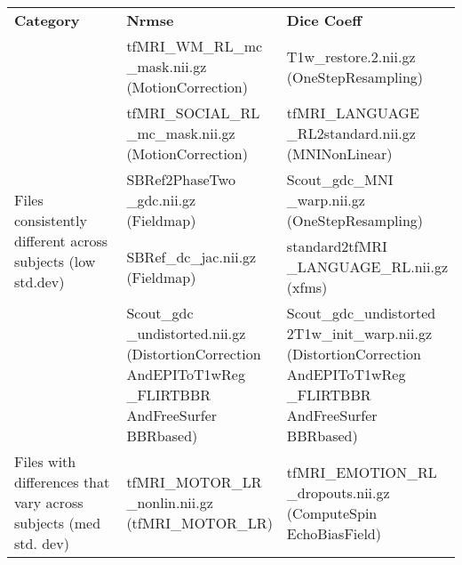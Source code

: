 \begin{center}
\begin{longtable}{|p{}|p{}|p{}|}
\cline{1-3}
\textbf{Category} & \textbf{Nrmse} & \textbf{Dice Coeff} \\\cline{1-3}
\multirow{5}{.3\textwidth}{Files consistently different across subjects (low std.dev)}     & \makecell[l]{tfMRI\_WM\_RL\_mc\\\_mask.nii.gz \\ (MotionCorrection)}  & \makecell[l]{T1w\_restore.2.nii.gz\\(OneStepResampling)} \\\cline{2-3}
& \makecell[l]{tfMRI\_SOCIAL\_RL\\\_mc\_mask.nii.gz\\(MotionCorrection)}                   & \makecell[l]{tfMRI\_LANGUAGE\\\_RL2standard.nii.gz\\(MNINonLinear)} \\\cline{2-3}
& \makecell[l]{SBRef2PhaseTwo\\\_gdc.nii.gz\\(Fieldmap)}                        & \makecell[l]{Scout\_gdc\_MNI\\\_warp.nii.gz\\(OneStepResampling)} \\\cline{2-3}
& \makecell[l]{SBRef\_dc\_jac.nii.gz\\(Fieldmap)}                        & \makecell[l]{standard2tfMRI\\\_LANGUAGE\_RL.nii.gz\\(xfms)} \\\cline{2-3}
& \makecell[l]{Scout\_gdc\\\_undistorted.nii.gz\\(DistortionCorrection\\AndEPIToT1wReg\\\_FLIRTBBR\\AndFreeSurfer\\BBRbased)}                     & \makecell[l]{Scout\_gdc\_undistorted\\2T1w\_init\_warp.nii.gz\\(DistortionCorrection\\AndEPIToT1wReg\\\_FLIRTBBR\\AndFreeSurfer\\BBRbased)} \\\cline{1-3}
\multirow{5}{.3\textwidth}{Files with differences that vary across subjects (med std. dev)} & \makecell[l]{tfMRI\_MOTOR\_LR\\\_nonlin.nii.gz\\(tfMRI\_MOTOR\_LR)}  & \makecell[l]{tfMRI\_EMOTION\_RL\\\_dropouts.nii.gz\\(ComputeSpin\\EchoBiasField)} \\\cline{2-3}

\end{longtable}
\end{center}
